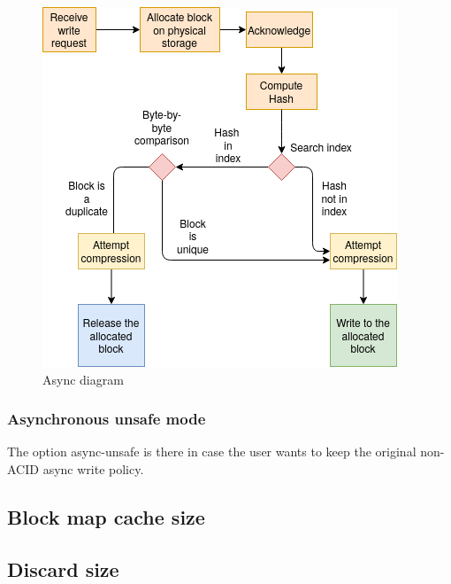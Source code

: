 \documentclass[
  color, %
  table, %
  lof,   %
  lot,   %
]{fithesis3}
\begin{document}
\begin{figure}[!htb]
        \centering
        \includegraphics[width=\textwidth]{graphics/diagrams/async.png}
\caption[Async]{Async diagram}
\label{fig:async}
\end{figure}

\subsubsection{Asynchronous unsafe mode}
The option async-unsafe is there in case the user wants to keep the original non-ACID async write policy.


\subsection{Block map cache size}


\subsection{Discard size}


\end{document}
